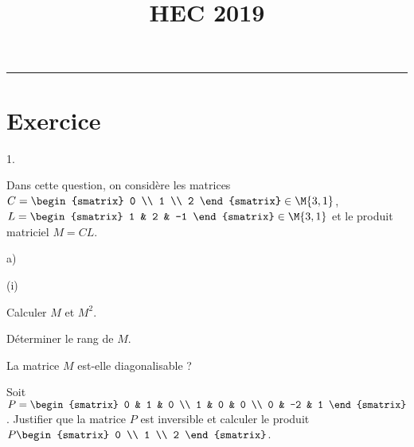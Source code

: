 \documentclass[11pt]{article}%
\title{\bf \vspace{-1.6cm} HEC 2019} %
\author{} %
\date{} %
\begin{document}
\maketitle %
\vspace{-1.2cm}\hrule %
\thispagestyle{fancy}

\vspace*{-.2cm}


\section*{Exercice}

\begin{noliste}{1.}
  \setlength{\itemsep}{4mm} %
\item Dans cette question, on considère les matrices $C =
  \begin{smatrix}
    0 \\
    1 \\
    2
  \end{smatrix}
  \in \M{3, 1}$, $L =
  \begin{smatrix}
    1 & 2 & -1
  \end{smatrix}
  \in \M{3, 1}$ et le produit matriciel $M = CL$.

  \begin{noliste}{a)}
    \setlength{\itemsep}{2mm} %
  \item
    \begin{nonoliste}{(i)}
      \setlength{\itemsep}{2mm} %
    \item Calculer $M$ et $M^2$.

    \item Déterminer le rang de $M$.

    \item La matrice $M$ est-elle diagonalisable ?
    \end{nonoliste}

  \item Soit $P =
    \begin{smatrix}
      0 & 1 & 0 \\
      1 & 0 & 0 \\
      0 & -2 & 1
    \end{smatrix}
    $. Justifier que la matrice $P$ est inversible et calculer le produit $P
    \begin{smatrix}
      0 \\
      1 \\
      2
    \end{smatrix}
    $.


\end{noliste}
\end{noliste}
\end{document}
